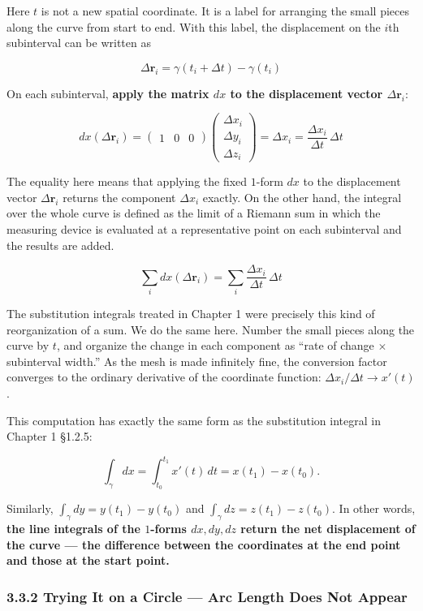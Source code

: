 Here \(t\) is not a new spatial coordinate. It is a label for arranging
the small pieces along the curve from start to end. With this label, the
displacement on the \(i\)th subinterval can be written as

\[
\Delta\mathbf{r}_i = \gamma(t_i+\Delta t)-\gamma(t_i)
\]

On each subinterval,
\textbf{apply the matrix $dx$ to the displacement vector $\Delta\mathbf{r}_i$}:

\[dx(\Delta\mathbf{r}_i) = \begin{pmatrix}1&0&0\end{pmatrix} \begin{pmatrix}\Delta x_i \\ \Delta y_i \\ \Delta z_i\end{pmatrix} = \Delta x_i = \frac{\Delta x_i}{\Delta t}\,\Delta t\]

The equality here means that applying the fixed \(1\)-form \(dx\) to the
displacement vector \(\Delta\mathbf{r}_i\) returns the component
\(\Delta x_i\) exactly. On the other hand, the integral over the whole
curve is defined as the limit of a Riemann sum in which the measuring
device is evaluated at a representative point on each subinterval and
the results are added.

\[\sum_i dx(\Delta\mathbf{r}_i) = \sum_i \frac{\Delta x_i}{\Delta t}\,\Delta t\]

The substitution integrals treated in Chapter 1 were precisely this kind
of reorganization of a sum. We do the same here. Number the small pieces
along the curve by \(t\), and organize the change in each component as
``rate of change \(\times\) subinterval width.'' As the mesh is made
infinitely fine, the conversion factor converges to the ordinary
derivative of the coordinate function:
\(\Delta x_i/\Delta t \to x'(t)\).

This computation has exactly the same form as the substitution integral
in Chapter 1 §1.2.5:

\[\int_\gamma dx = \int_{t_0}^{t_1} x'(t)\,dt = x(t_1)-x(t_0).\]

Similarly, \(\int_\gamma dy = y(t_1) - y(t_0)\) and
\(\int_\gamma dz = z(t_1) - z(t_0)\). In other words,
\textbf{the line integrals of the $1$-forms $dx, dy, dz$ return the net displacement of the curve — the difference between the coordinates at the end point and those at the start point.}

\hypertarget{trying-it-on-a-circle-arc-length-does-not-appear}{%
\subsubsection{3.3.2 Trying It on a Circle --- Arc Length Does Not
Appear}\label{trying-it-on-a-circle-arc-length-does-not-appear}}

